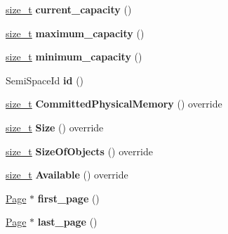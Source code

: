 \begin{DoxyCompactItemize}
\mbox{\hyperlink{classsize__t}{size\+\_\+t}} {\bfseries current\+\_\+capacity} ()
\item 
\mbox{\label{classv8_1_1internal_1_1SemiSpace_a72b4e41930c66bfa371024a60bed1188}} 
\mbox{\hyperlink{classsize__t}{size\+\_\+t}} {\bfseries maximum\+\_\+capacity} ()
\item 
\mbox{\label{classv8_1_1internal_1_1SemiSpace_abbc98d9f86e7298a3d25c4f1efb38b8d}} 
\mbox{\hyperlink{classsize__t}{size\+\_\+t}} {\bfseries minimum\+\_\+capacity} ()
\item 
\mbox{\label{classv8_1_1internal_1_1SemiSpace_acdc44c71f23654cb7a127db798a1a52a}} 
Semi\+Space\+Id {\bfseries id} ()
\item 
\mbox{\label{classv8_1_1internal_1_1SemiSpace_a0f0477f262aa4c64a4f19bdd7d9807ca}} 
\mbox{\hyperlink{classsize__t}{size\+\_\+t}} {\bfseries Committed\+Physical\+Memory} () override
\item 
\mbox{\label{classv8_1_1internal_1_1SemiSpace_a753d1807262923c9143c834c07846fb0}} 
\mbox{\hyperlink{classsize__t}{size\+\_\+t}} {\bfseries Size} () override
\item 
\mbox{\label{classv8_1_1internal_1_1SemiSpace_a91e11a4ef83ade96e3f9de2e318553c9}} 
\mbox{\hyperlink{classsize__t}{size\+\_\+t}} {\bfseries Size\+Of\+Objects} () override
\item 
\mbox{\label{classv8_1_1internal_1_1SemiSpace_ad6bbfb9bc189930740d60d111dcd3330}} 
\mbox{\hyperlink{classsize__t}{size\+\_\+t}} {\bfseries Available} () override
\item 
\mbox{\label{classv8_1_1internal_1_1SemiSpace_affb8b730722b64f2d78bcce0bad0c955}} 
\mbox{\hyperlink{classv8_1_1internal_1_1Page}{Page}} $\ast$ {\bfseries first\+\_\+page} ()
\item 
\mbox{\label{classv8_1_1internal_1_1SemiSpace_a05505b721b9aa32f50d11ba48abad3b1}} 
\mbox{\hyperlink{classv8_1_1internal_1_1Page}{Page}} $\ast$ {\bfseries last\+\_\+page} ()

\end{DoxyCompactItemize}
